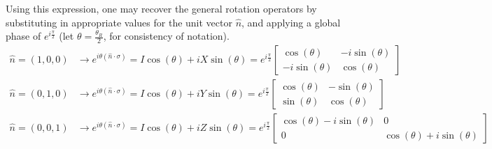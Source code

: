 Using this expression, one may recover the general rotation operators by substituting in appropriate values for the unit vector $\hat{n}$, and applying a global phase of $e^{i\frac{\pi}{2}}$ (let $\theta = \frac{\theta_R}{2}$, for consistency of notation).
\begin{align*}
	\hat{n} = (1, 0, 0) 
	&\rightarrow 
	e^{i\theta(\hat{n} \cdot \sigma)} = I \cos(\theta) + iX \sin(\theta) = e^{i\frac{\pi}{2}}\begin{bmatrix}
		\cos(\theta) & -i\sin(\theta) \\
		-i\sin(\theta) & \cos(\theta)
	\end{bmatrix} \\
	\hat{n} = (0, 1, 0) 
	&\rightarrow 
	e^{i\theta(\hat{n} \cdot \sigma)} = I \cos(\theta) + iY \sin(\theta) = e^{i\frac{\pi}{2}}\begin{bmatrix}
		\cos(\theta) & -\sin(\theta) \\
		\sin(\theta) & \cos(\theta)
	\end{bmatrix} \\
	\hat{n} = (0, 0, 1) 
	&\rightarrow 
	e^{i\theta(\hat{n} \cdot \sigma)} = I \cos(\theta) + iZ \sin(\theta) = e^{i\frac{\pi}{2}}\begin{bmatrix}
		\cos(\theta) -i\sin(\theta) & 0 \\
		0 & \cos(\theta) + i\sin(\theta)
	\end{bmatrix} 
\end{align*}




